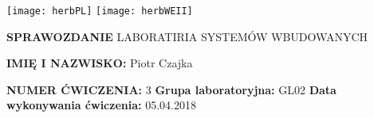 \documentclass[12pt]{article}
\begin{document}
    \begin{center}
        \texttt{[image: herbPL]}
        \hspace{2cm}
        \texttt{[image: herbWEII]}
    \end{center}
    \centering
    {\Huge \textbf{SPRAWOZDANIE}}
    \vspace{0.5cm}
    \newline
    {\large LABORATIRIA SYSTEMÓW WBUDOWANYCH}
    \vfill
    \raggedright%
    \textbf{IMIĘ I NAZWISKO:} Piotr Czajka

    \newpage
    \textbf{NUMER ĆWICZENIA:} 3
    \newline
    \textbf{Grupa laboratoryjna:} GL02
    \newline
    \textbf{Data wykonywania ćwiczenia:} 05.04.2018
    \newline

    \newpage

    \tableofcontents

    \newpage
\end{document}
